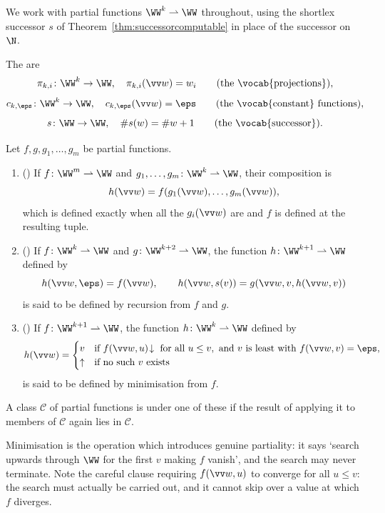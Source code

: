 We work with partial functions $\WW^k \rightharpoonup \WW$ throughout, using the shortlex successor $s$ of Theorem~\ref{thm:successorcomputable} in place of the successor on $\N$.

\begin{definition}
	The  are
	$$\pi_{k,i} \colon \WW^k \to \WW, \quad \pi_{k,i}(\vv w) = w_i \qquad (\text{the \vocab{projections}}),$$
	$$c_{k,\eps} \colon \WW^k \to \WW, \quad c_{k,\eps}(\vv w) = \eps \qquad (\text{the \vocab{constant} functions}),$$
	$$s \colon \WW \to \WW, \quad \#s(w) = \#w + 1 \qquad (\text{the \vocab{successor}}).$$
\end{definition}

\begin{definition}
	Let $f, g, g_1, \dots, g_m$ be partial functions.
	\begin{enumerate}[label=(\roman*)]
		\item () If $f \colon \WW^m\rightharpoonup\WW$ and $g_1,\dots,g_m \colon \WW^k \rightharpoonup \WW$, their composition is
		$$h(\vv w) = f(g_1(\vv w), \dots, g_m(\vv w)),$$
		which is defined exactly when all the $g_i(\vv w)$ are and $f$ is defined at the resulting tuple.
		\item () If $f \colon \WW^k\rightharpoonup\WW$ and $g\colon\WW^{k+2}\rightharpoonup\WW$, the function $h \colon \WW^{k+1}\rightharpoonup\WW$ defined by
		$$h(\vv w, \eps) = f(\vv w), \qquad h(\vv w, s(v)) = g(\vv w, v, h(\vv w, v))$$
		is said to be defined by recursion from $f$ and $g$.
		\item () If $f\colon\WW^{k+1}\rightharpoonup\WW$, the function $h \colon \WW^k\rightharpoonup\WW$ defined by
		$$h(\vv w) = \begin{cases} v & \text{if } f(\vv w, u)\!\downarrow \text{ for all } u \leq v, \text{ and } v \text{ is least with } f(\vv w, v) = \eps, \\ \uparrow & \text{if no such } v \text{ exists}\end{cases}$$
		is said to be defined by minimisation from $f$.
	\end{enumerate}
	A class $\mathcal C$ of partial functions is  under one of these if the result of applying it to members of $\mathcal C$ again lies in $\mathcal C$.
\end{definition}

Minimisation is the operation which introduces genuine partiality: it says `search upwards through $\WW$ for the first $v$ making $f$ vanish', and the search may never terminate. Note the careful clause requiring $f(\vv w,u)$ to converge for all $u \leq v$: the search must actually be carried out, and it cannot skip over a value at which $f$ diverges.

